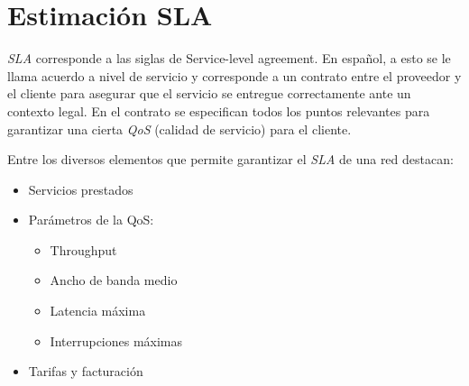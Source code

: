 \section{Estimación SLA}
\label{sec:SLA}

\emph{SLA} corresponde a las siglas de Service-level agreement. En
español, a esto se le llama acuerdo a nivel de servicio y corresponde
a un contrato entre el proveedor y el cliente para asegurar que el
servicio se entregue correctamente ante un contexto legal. En el
contrato se especifican todos los puntos relevantes para garantizar
una cierta \emph{QoS} (calidad de servicio) para el cliente.

Entre los diversos elementos que permite garantizar el \emph{SLA} de
una red destacan:
\begin{itemize}
\item Servicios prestados
\item Parámetros de la QoS:
  \begin{itemize}
  \item Throughput
  \item Ancho de banda medio
  \item Latencia máxima
  \item Interrupciones máximas
  \end{itemize}
\item Tarifas y facturación
\end{itemize}
